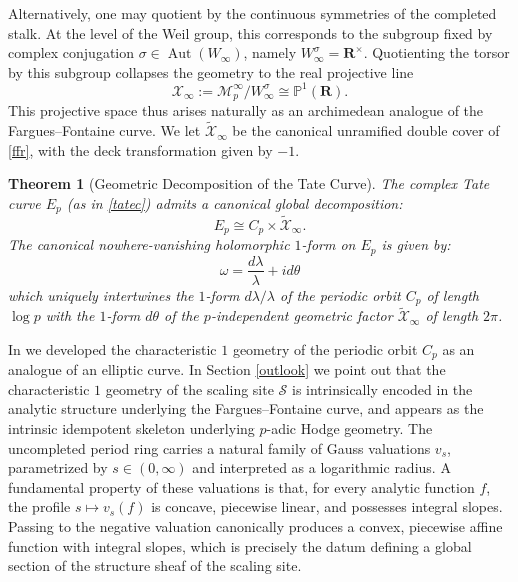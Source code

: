 \documentclass[11pt,a4paper]{article}
\newtheorem{thm}{Theorem}
\newcommand{\R}{\mathbf{R}}
\begin{document}
Alternatively, one may quotient by the continuous symmetries of the completed stalk. At the level of the Weil group, this corresponds to the subgroup fixed by complex conjugation
$\sigma\in \operatorname{Aut}(W_\infty)$,
namely
$W_\infty^\sigma=\R^\times$.
Quotienting the torsor by this subgroup collapses the geometry to the real projective line
\begin{equation}\label{ffr}
\mathcal{X}_\infty:=\mathcal M_p^\infty/W_\infty^\sigma \cong \mathbb{P}^1(\R).
\end{equation} 
This projective space thus arises naturally as an archimedean analogue of the Fargues–Fontaine curve. We let $\tilde{\mathcal{X}}_\infty$ be the canonical unramified double cover of  \eqref{ffr},   with the deck transformation given by  $ -1$.\vspace{.03in}


\begin{thm}[Geometric Decomposition of the  Tate Curve]\label{thm:tate_decomposition}
The complex Tate curve $E_p$ (as in \eqref{tatec}) 
 admits a canonical global decomposition:
\[
E_p \cong C_p \times \tilde{\mathcal{X}}_\infty.
\]
 The canonical nowhere-vanishing holomorphic $1$-form on $E_p$ is given by:
\[
\omega = \frac{d\lambda}{\lambda} + i d\theta
\]
which uniquely intertwines the  $1$-form $d\lambda/\lambda$ of the periodic orbit $C_p$ of length $\log p$ with the $1$-form $d\theta$  of the $p$-independent geometric factor $\tilde{\mathcal{X}}_\infty$ of length $2\pi$.
\end{thm}
In \cite{CC3} we developed the characteristic $1$ geometry of the periodic orbit $C_p$  as an analogue of an elliptic curve. 
In Section \ref{outlook} we point out that the  characteristic $1$ geometry of the scaling site $\mathscr S$ \cite{CC3} is intrinsically encoded in the analytic structure underlying the Fargues–Fontaine curve, and appears as the intrinsic idempotent skeleton underlying $p$-adic Hodge geometry. The uncompleted period ring carries a natural family of Gauss valuations $v_s$, parametrized by $s\in(0,\infty)$ and interpreted as a logarithmic radius. A fundamental property of these valuations is that, for every analytic function $f$, the profile
$s\mapsto v_s(f)$
is concave, piecewise linear, and possesses integral slopes. Passing to the negative valuation canonically produces a convex, piecewise affine function with integral slopes, which is precisely the datum defining a global section of the structure sheaf of the scaling site.
\end{document}
